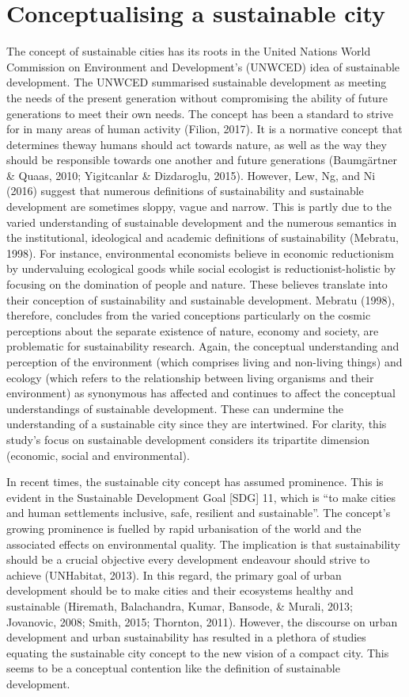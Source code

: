 \section{Conceptualising a sustainable city}

The concept of sustainable cities has its roots in the United Nations World Commission on Environment and Development's (UNWCED) idea of sustainable development. The UNWCED summarised sustainable development as meeting the needs of the present generation without compromising the ability of future generations to meet their own needs. The concept has been a standard to strive for in many areas of human activity (Filion, 2017). It is a normative concept that determines theway humans should act towards nature, as well as the way they should be responsible towards one another and future generations (Baumgärtner \& Quaas, 2010; Yigitcanlar \& Dizdaroglu, 2015). However, Lew, Ng, and Ni (2016) suggest that numerous definitions of sustainability and sustainable development are sometimes sloppy, vague and narrow. This is partly due to the varied understanding of sustainable development and the numerous semantics in the institutional, ideological and academic definitions of sustainability (Mebratu, 1998). For instance, environmental economists believe in economic reductionism by undervaluing ecological goods while social ecologist is reductionist-holistic by focusing on the domination of people and nature. These believes translate into their conception of sustainability and sustainable development. Mebratu (1998), therefore, concludes from the varied conceptions particularly on the cosmic perceptions about the separate existence of nature, economy and society, are problematic for sustainability research. Again, the conceptual understanding and perception of the environment (which comprises living and non-living things) and ecology (which refers to the relationship between living organisms and their environment) as synonymous has affected and continues to affect the conceptual understandings of sustainable development. These can undermine the understanding of a sustainable city since they are intertwined. For clarity, this study's focus on sustainable development considers its tripartite dimension (economic, social and environmental).

In recent times, the sustainable city concept has assumed prominence. This is evident in the Sustainable Development Goal [SDG] 11, which is “to make cities and human settlements inclusive, safe, resilient and sustainable”. The concept's growing prominence is fuelled by rapid urbanisation of the world and the associated effects on environmental quality. The implication is that sustainability should be a crucial objective every development endeavour should strive to achieve (UNHabitat, 2013). In this regard, the primary goal of urban development should be to make cities and their ecosystems healthy and sustainable (Hiremath, Balachandra, Kumar, Bansode, \& Murali, 2013; Jovanovic, 2008; Smith, 2015; Thornton, 2011). However, the discourse on urban development and urban sustainability has resulted in a plethora of studies equating the sustainable city concept to the new vision of a compact city. This seems to be a conceptual contention like the definition of sustainable development.

